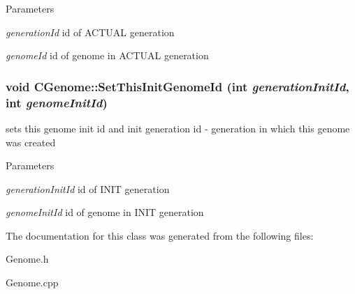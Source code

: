 \begin{DoxyParams}{Parameters}
\item[{\em generationId}]id of ACTUAL generation \item[{\em genomeId}]id of genome in ACTUAL generation \end{DoxyParams}
\hypertarget{classCGenome_af3df7338e44deb4a81dc6d7171b8aac4}{
\subsubsection[{SetThisInitGenomeId}]{\setlength{\rightskip}{0pt plus 5cm}void CGenome::SetThisInitGenomeId (int {\em generationInitId}, \/  int {\em genomeInitId})}}
\label{classCGenome_af3df7338e44deb4a81dc6d7171b8aac4}
sets this genome init id and init generation id -\/ generation in which this genome was created


\begin{DoxyParams}{Parameters}
\item[{\em generationInitId}]id of INIT generation \item[{\em genomeInitId}]id of genome in INIT generation \end{DoxyParams}


The documentation for this class was generated from the following files:\begin{DoxyCompactItemize}
\item 
Genome.h\item 
Genome.cpp\end{DoxyCompactItemize}
